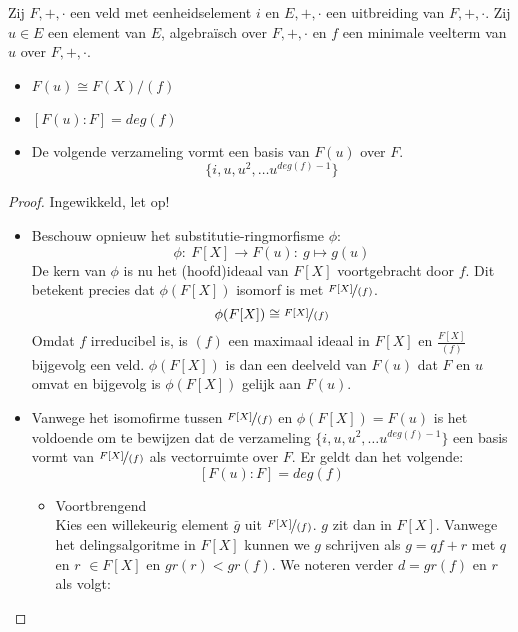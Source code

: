 \documentclass[main.tex]{subfiles}
\begin{document}
\begin{st}
  \label{st:uitbreiding-van-algebraische-u-aan-veld-graad-minimale-veelterm}
  Zij $F,+,\cdot$ een veld met eenheidselement $i$ en $E,+,\cdot$ een uitbreiding van $F,+,\cdot$.
  Zij $u\in E$ een element van $E$, algebra\"isch over $F,+,\cdot$ en $f$ een minimale veelterm van $u$ over $F,+,\cdot$.
  \begin{itemize}
  \item $F(u) \cong F(X)/(f)$
  \item $[F(u):F] = deg(f)$
  \item De volgende verzameling vormt een basis van $F(u)$ over $F$.
  \[ \{ i,u,u^{2},\dotsc u^{deg(f)-1} \}\]
  \end{itemize}

  \begin{proof}
    Ingewikkeld, let op!
    \begin{itemize}
    \item Beschouw opnieuw het substitutie-ringmorfisme $\phi$:
      \[ \phi:\ F[X] \rightarrow F(u):\ g \mapsto g(u) \]
      De kern van $\phi$ is nu het (hoofd)ideaal van $F[X]$ voortgebracht door $f$.
      Dit betekent precies dat $\phi(F[X])$ isomorf is met $\nicefrac{F[X]}{(f)}$.
      \[ \phi(F[X]) \cong \nicefrac{F[X]}{(f)} \]
      Omdat $f$ irreducibel is, is $(f)$ een maximaal ideaal in $F[X]$ en $\frac{F[X]}{(f)}$ bijgevolg een veld.
      $\phi(F[X])$ is dan een deelveld van $F(u)$ dat $F$ en $u$ omvat en bijgevolg is $\phi(F[X])$ gelijk aan $F(u)$.
    \item Vanwege het isomofirme tussen $\nicefrac{F[X]}{(f)}$ en $\phi(F[X]) = F(u)$ is het voldoende om te bewijzen dat de verzameling $\{ i,u,u^{2},\dotsc u^{deg(f)-1} \}$ een basis vormt van $\nicefrac{F[X]}{(f)}$ als vectorruimte over $F$.
      Er geldt dan het volgende:
      \[ [F(u):F] = deg(f) \]
      \begin{itemize}
      \item Voortbrengend\\
        Kies een willekeurig element $\bar{g}$ uit $\nicefrac{F[X]}{(f)}$.
        $g$ zit dan in $F[X]$.
        Vanwege het delingsalgoritme in $F[X]$ kunnen we $g$ schrijven als $g=qf+r$ met $q$ en $r$ $\in F[X]$ en $gr(r) < gr(f)$.
        We noteren verder $d=gr(f)$ en $r$ als volgt:

\end{itemize}
\end{itemize}
\end{proof}
\end{st}
\end{document}
